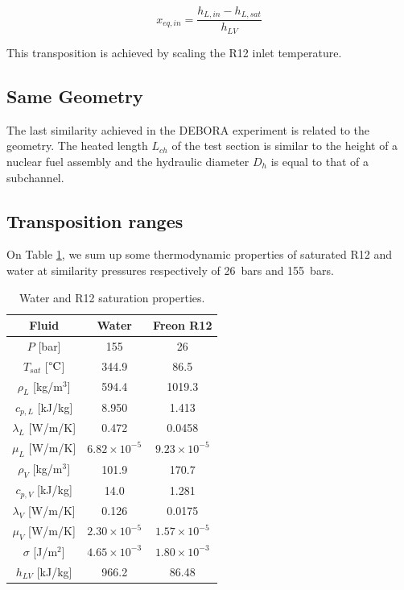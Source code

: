 \begin{equation}
x_{eq,in} = \frac{h_{L,in} - h_{L,sat}}{h_{LV}}
\end{equation}

\begin{note*}{}
This transposition is achieved by scaling the R12 inlet temperature.
\end{note*}

\subsection{Same Geometry}

The last similarity achieved in the DEBORA experiment is related to the geometry. The heated length $L_{ch}$ of the test section is similar to the height of a nuclear fuel assembly and the hydraulic diameter $D_{h}$ is equal to that of a subchannel.


\subsection{Transposition ranges}

On Table \ref{tab:R12_PWR_properties}, we sum up some thermodynamic properties of saturated R12 and water at similarity pressures respectively of 26\ bars and 155\ bars.

\begin{table}[!h]
\centering
\begin{tabular}{c||c|c} 

Fluid & Water & Freon R12 \\
\hline 
$P$ [bar] & 155 & 26\\
%
$T_{sat}$ [$\degree\mathrm{C}$] & 344.9 & 86.5 \\
%
\hline
\hline
$\rho_{L}$ [kg/m$^{3}$] & 594.4 & 1019.3 \\
%
$c_{p,L}$ [kJ/kg] & 8.950 & 1.413\\ 
%
$\lambda_{L}$ [W/m/K] & 0.472 & 0.0458\\
%
$\mu_{L}$ [W/m/K] & $6.82 \times 10^{-5}$ & $9.23 \times 10^{-5}$\\
\hline
\hline 
$\rho_{V}$ [kg/m$^{3}$] & 101.9 & 170.7 \\
%
$c_{p,V}$ [kJ/kg] & 14.0 & 1.281\\ 
%
$\lambda_{V}$ [W/m/K] & 0.126 & 0.0175\\
%
$\mu_{V}$ [W/m/K] & $2.30 \times 10^{-5}$ & $1.57 \times 10 ^{-5}$\\
\hline
\hline
$\sigma$ [J/m$^{2}$] & $4.65\times 10^{-3}$ & $1.80 \times 10^{-3}$ \\
%
$h_{LV}$ [kJ/kg] & 966.2 & 86.48 \\
\end{tabular}

\caption{Water and R12 saturation properties.}
\label{tab:R12_PWR_properties}

\end{table}




